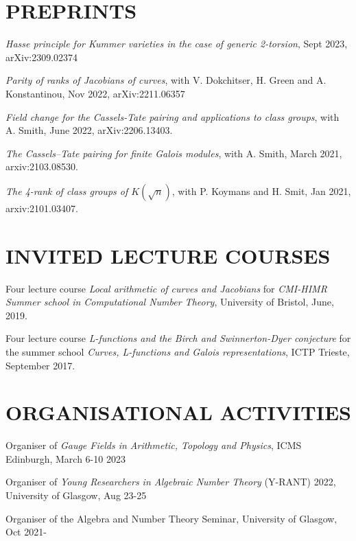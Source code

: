 \documentclass{res}
\begin{document}
\begin{resume}
\section{PREPRINTS}         
        
\bigskip

{\it Hasse principle for Kummer varieties in the case of generic 2-torsion}, Sept 2023, arXiv:2309.02374


{\it Parity of ranks of Jacobians of curves}, with V. Dokchitser, H. Green and A. Konstantinou, Nov 2022, arXiv:2211.06357   

{\it Field change for the Cassels-Tate pairing and applications to class groups}, with A. Smith, June 2022, arXiv:2206.13403. \

{\it The Cassels--Tate pairing for finite Galois modules}, with A. Smith, March 2021, arxiv:2103.08530. \

{\it The 4-rank of class groups of $K(\sqrt{n}) $}, with P. Koymans and H. Smit, Jan 2021, arxiv:2101.03407. \






\section{INVITED LECTURE COURSES}

\bigskip
\vspace{-0.1in}
Four lecture course {\it Local arithmetic of curves and Jacobians} for {\it CMI-HIMR Summer school in Computational Number Theory}, University of Bristol, June, 2019.

Four lecture course {\it L-functions and the Birch and Swinnerton-Dyer conjecture} for the summer school {\it Curves, L-functions and Galois representations}, ICTP Trieste, September 2017.\

 \section{ORGANISATIONAL ACTIVITIES}
 
 \medskip
 
 \textup{Organiser of \textit{Gauge Fields in Arithmetic, Topology and Physics}},   \textup{ICMS Edinburgh, March 6-10 2023}  
 
\textup{Organiser of \textit{Young Researchers in Algebraic Number Theory} (Y-RANT) 2022},   \textup{University of Glasgow, Aug 23-25}  
 
\textup{Organiser of the  Algebra and Number Theory Seminar, }   \textup{University of Glasgow, Oct 2021-}\medskip\\



\end{resume}
\end{document}
